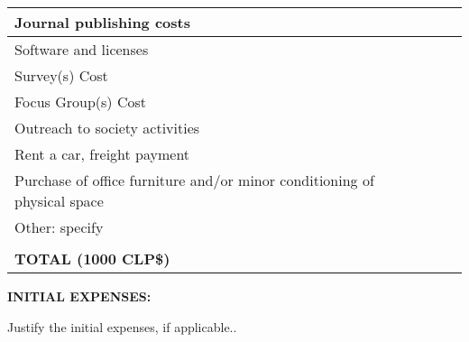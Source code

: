 ﻿\documentclass[10pt]{article}
\begin{document}
\begin{center}
\begin{tabular}{|p{324pt}|p{35pt}|p{35pt}|p{35pt}|}
\parbox{324pt}{\raggedright 
{\small Journal publishing costs}
} & \parbox{35pt}{\centering }
& \parbox{35pt}{\centering }
& \parbox{35pt}{\centering } \\
\hline
\parbox{324pt}{\raggedright 
{\small Software and licenses} } 
& \parbox{35pt}{\centering }
& \parbox{35pt}{\centering } 
& \parbox{35pt}{\centering } \\
\hline
\parbox{324pt}{\raggedright 
{\small Survey(s) Cost} } 
& \parbox{35pt}{\centering }
& \parbox{35pt}{\centering } 
& \parbox{35pt}{\centering } \\
\hline
\parbox{324pt}{\raggedright 
{\small Focus Group(s) Cost}
} & \parbox{35pt}{\centering } & \parbox{35pt}{\centering }
& \parbox{35pt}{\centering } \\
\hline
\parbox{324pt}{\raggedright 
{\small Outreach to society activities} } 
& \parbox{35pt}{\centering } & \parbox{35pt}{\centering }
& \parbox{35pt}{\centering } \\
\hline
\parbox{324pt}{\raggedright 
{\small Rent a car, freight payment} } 
& \parbox{35pt}{\centering } 
& \parbox{35pt}{\centering } 
& \parbox{35pt}{\centering } \\
\hline
\parbox{324pt}{\raggedright 
{\small Purchase of office furniture and/or minor conditioning of physical space} }
& \parbox{35pt}{\centering }
& \parbox{35pt}{\centering }
& \parbox{35pt}{\centering } \\
\hline
\parbox{324pt}{\raggedright 
{\small Other: specify}
} & \parbox{35pt}{\centering }
& \parbox{35pt}{\centering }
& \parbox{35pt}{\centering } \\
\hline
\parbox{324pt}{\raggedright }
& \parbox{35pt}{\centering }
& \parbox{35pt}{\centering }
& \parbox{35pt}{\centering } \\
\hline
\parbox{324pt}{\raggedleft 
\textbf{{\small TOTAL (1000 CLP\$)}} }
& \parbox{35pt}{\centering } 
& \parbox{35pt}{\centering } 
& \parbox{35pt}{\centering } \\
\hline
\end{tabular}
\end{center}


\vspace{15pt}
\noindent \textbf{INITIAL EXPENSES:}

\noindent Justify the initial expenses, if applicable..
\end{document}
